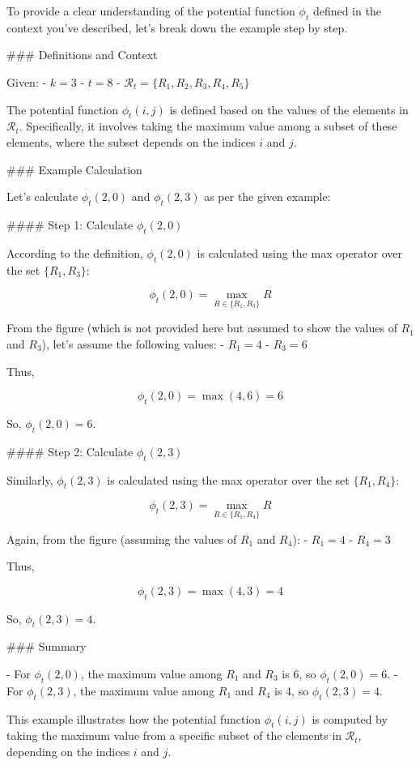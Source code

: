To provide a clear understanding of the potential function \(\phi_t\) defined in the context you've described, let's break down the example step by step.

### Definitions and Context

Given:
- \( k = 3 \)
- \( t = 8 \)
- \(\mathcal{R}_t = \{R_1, R_2, R_3, R_4, R_5\}\)

The potential function \(\phi_t(i, j)\) is defined based on the values of the elements in \(\mathcal{R}_t\). Specifically, it involves taking the maximum value among a subset of these elements, where the subset depends on the indices \(i\) and \(j\).

### Example Calculation

Let's calculate \(\phi_t(2, 0)\) and \(\phi_t(2, 3)\) as per the given example:

#### Step 1: Calculate \(\phi_t(2, 0)\)

According to the definition, \(\phi_t(2, 0)\) is calculated using the max operator over the set \(\{R_1, R_3\}\):

\[
\phi_t(2, 0) = \max_{R \in \{R_1, R_3\}} R
\]

From the figure (which is not provided here but assumed to show the values of \(R_1\) and \(R_3\)), let's assume the following values:
- \(R_1 = 4\)
- \(R_3 = 6\)

Thus,

\[
\phi_t(2, 0) = \max(4, 6) = 6
\]

So, \(\phi_t(2, 0) = 6\).

#### Step 2: Calculate \(\phi_t(2, 3)\)

Similarly, \(\phi_t(2, 3)\) is calculated using the max operator over the set \(\{R_1, R_4\}\):

\[
\phi_t(2, 3) = \max_{R \in \{R_1, R_4\}} R
\]

Again, from the figure (assuming the values of \(R_1\) and \(R_4\)):
- \(R_1 = 4\)
- \(R_4 = 3\)

Thus,

\[
\phi_t(2, 3) = \max(4, 3) = 4
\]

So, \(\phi_t(2, 3) = 4\).

### Summary

- For \(\phi_t(2, 0)\), the maximum value among \(R_1\) and \(R_3\) is 6, so \(\phi_t(2, 0) = 6\).
- For \(\phi_t(2, 3)\), the maximum value among \(R_1\) and \(R_4\) is 4, so \(\phi_t(2, 3) = 4\).

This example illustrates how the potential function \(\phi_t(i, j)\) is computed by taking the maximum value from a specific subset of the elements in \(\mathcal{R}_t\), depending on the indices \(i\) and \(j\).